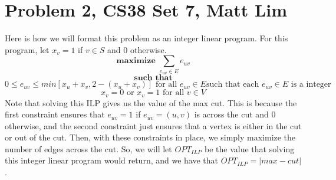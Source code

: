 \documentclass{article}
\begin{document}
\section*{Problem 2, CS38 Set 7, Matt Lim}
Here is how we will format this problem as an integer linear program. For this
program, let $x_v = 1$ if $v \in S$ and $0$ otherwise.
\[ \textbf{maximize } \sum_{e_{uv} \in E} e_{uv} \]
\[ \textbf{such that} \]
\[ 0 \leq e_{uv} \leq min[x_u + x_v, 2 - (x_u + x_v)] \text{ for all $e_{uv} \in E$
such that each $e_{uv} \in E$ is a integer} \]
\[ x_v = 0 \text{ or } x_v = 1 \text{ for all $v \in V$} \]
Note that solving this ILP gives us the value of the max cut. This is because
the first constraint ensures that $e_{uv} = 1$ if
$e_{uv} = (u,v)$ is across the cut and $0$ otherwise, and the second constraint
just ensures that a vertex is either in the cut or out of the cut. Then, with
these constraints in place, we simply maximize the number of
edges across the cut. So, we will let $OPT_{ILP}$ be the value that solving this
integer linear program would return, and we have that $OPT_{ILP} = |max-cut|$.
\end{document}
